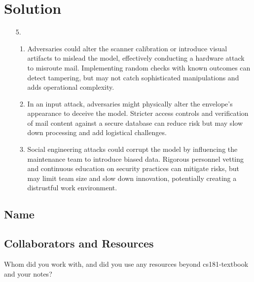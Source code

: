 \documentclass[submit]{harvardml}
\newenvironment{answer}
  {\section*{Solution}}
{}
\begin{document}
\begin{answer}
\begin{enumerate}
    \item[5.]

      \begin{enumerate}
        \item Adversaries could alter the scanner calibration or introduce visual artifacts to mislead the model, effectively conducting a hardware attack to misroute mail. Implementing random checks with known outcomes can detect tampering, but may not catch sophisticated manipulations and adds operational complexity.
        
        \item In an input attack, adversaries might physically alter the envelope's appearance to deceive the model. Stricter access controls and verification of mail content against a secure database can reduce risk but may slow down processing and add logistical challenges.

        \item Social engineering attacks could corrupt the model by influencing the maintenance team to introduce biased data. Rigorous personnel vetting and continuous education on security practices can mitigate risks, but may limit team size and slow down innovation, potentially creating a distrustful work environment.

      \end{enumerate}


  \end{enumerate}

\end{answer}


\newpage
\subsection*{Name}

\subsection*{Collaborators and Resources}
Whom did you work with, and did you use any resources beyond cs181-textbook and your notes?
\end{document}
